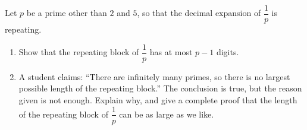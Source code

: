 Let $p$ be a prime other than $2$ and $5$, so that the decimal expansion of $\dfrac{1}{p}$ is repeating.
\begin{enumerate}
\item[(a)] Show that the repeating block of $\dfrac{1}{p}$ has at most $p-1$ digits.
\item[(b)] A student claims: ``There are infinitely many primes, so there is no largest possible length of the repeating block.'' The conclusion is true, but the reason given is not enough. Explain why, and give a complete proof that the length of the repeating block of $\dfrac{1}{p}$ can be as large as we like.
\end{enumerate}
